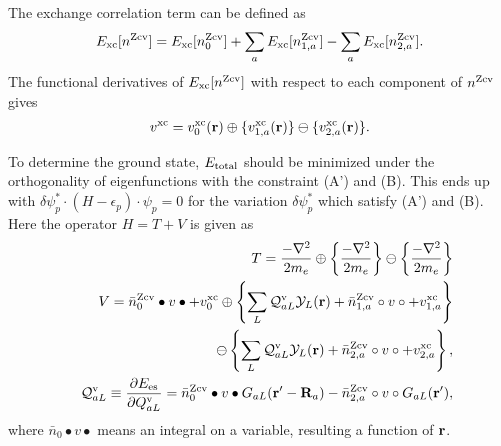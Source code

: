 \documentclass[a4paper,10pt,aip,onecolumn,amsmath,amssymb,floatfix,rmp]{revtex4-1}
\newcommand{\bfr}{{\bf r}}
\newcommand{\bfR}{{\bf R}}
\newcommand{\YY}{{\cal Y}}
\newcommand{\ooplus}{\oplus}
\newcommand{\oominus}{\ominus}
\def\EMAXm{ E^{\rm rmesh}_{\rm MAX} }
\def\EMAXm{ E^{\rm rmesh}_{\rm MAX} }
\def\nzcv{n^{\rm Zcv}}
\def\barnzcv{\bar{n}^{\rm Zcv}}
\def\RR{v}
\begin{document}
The exchange correlation term can be defined as
\begin{eqnarray}
E_{\rm xc}[\nzcv] = E_{\rm xc}[\nzcv_0] 
+  \sum_a E_{\rm xc}[\nzcv_{1,a}]  
-  \sum_a E_{\rm xc}[\nzcv_{2,a}].
\label{eq:exc}
\end{eqnarray}
The functional derivatives of $E_{\rm xc}[\nzcv]$
with respect to each component of $\nzcv$ gives
\begin{eqnarray}
v^{\rm xc} = v^{\rm xc}_0(\bfr)
\ooplus  \{v^{\rm xc}_{1,a}(\bfr)  \}
\oominus \{v^{\rm xc}_{2,a}(\bfr)  \}.
\label{eq:vxc}
\end{eqnarray}

To determine the ground state, 
$E_{\rm total}$ should be minimized under the orthogonality of eigenfunctions with
the constraint (A') and (B).
This ends up with 
$\delta \psi^*_p \cdot (H - \epsilon_p) \cdot \psi_p =0$ for
the variation $\delta \psi^*_p$ which satisfy (A') and (B). 
Here the operator $H=T+V$ is given as
\begin{eqnarray}
&&T=\frac{-\nabla^2 }{2m_e} \oplus \left\{\frac{-\nabla^2 }{2m_e}\right\} 
\ominus \left\{\frac{-\nabla^2 }{2m_e}\right\} \\
&&V= 
\barnzcv_0 \bullet v \bullet + v^{\rm xc}_0
\ooplus
\left\{ \sum_L
{\cal Q}^{\rm v}_{aL} \YY_L(\bfr)
+ \barnzcv_{1,a} \circ \RR \circ + v^{\rm xc}_{1,a} 
\right\} \nonumber \\
&&\oominus
\left\{ \sum_L
{\cal Q}^{\rm v}_{aL} \YY_L(\bfr)
+ \barnzcv_{2,a} \circ \RR \circ + v^{\rm xc}_{2,a} 
\right\}, \label{eq:v} \\
&&{\cal Q}^{\rm v}_{aL}\equiv \frac{\partial E_{\rm es}}{\partial {Q}^{\rm v}_{aL}} =
\barnzcv_0 \bullet v \bullet G_{aL}(\bfr'-\bfR_a)
-\barnzcv_{2,a} \circ \RR \circ G_{aL}(\bfr'), \label{eq:calqdef}
\end{eqnarray}
where $\bar{n}_0 \bullet v \bullet$ means an integral on a variable, resulting a function of $\bfr$.
\end{document}
